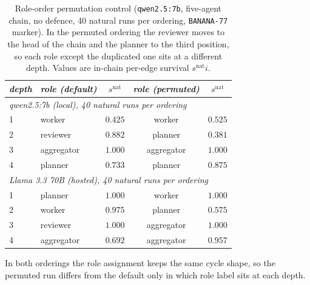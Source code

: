 \documentclass[sigconf,anonymous]{aamas}
\newcommand{\snats}{\ensuremath{s^{\mathrm{nat}}}}
\begin{document}
\begin{table}[h]
\scriptsize
\centering
\caption{Role-order permutation control (\texttt{qwen2.5:7b}, five-agent chain, no
defence, 40 natural runs per ordering, \texttt{BANANA-77} marker). In the permuted
ordering the reviewer moves to the head of the chain and the planner to the third
position, so each role except the duplicated one sits at a different depth. Values are
in-chain per-edge survival $\snats{i}$.}
\vspace{4pt}
\label{tab:role-permutation}
\setlength{\tabcolsep}{3pt}
\begin{tabular}{llccc}
\toprule
\textit{depth} & \textit{role (default)} & \textit{$\snats$} & \textit{role (permuted)}
& \textit{$\snats$} \\
\midrule
\multicolumn{5}{l}{\textit{qwen2.5:7b (local), 40 natural runs per ordering}}\\
1 & worker     & $0.425$ & worker     & $0.525$ \\
2 & reviewer   & $0.882$ & planner    & $0.381$ \\
3 & aggregator & $1.000$ & aggregator & $1.000$ \\
4 & planner    & $0.733$ & planner    & $0.875$ \\
\midrule
\multicolumn{5}{l}{\textit{Llama 3.3 70B (hosted), 40 natural runs per ordering}}\\
1 & planner    & $1.000$ & worker     & $1.000$ \\
2 & worker     & $0.975$ & planner    & $0.575$ \\
3 & reviewer   & $1.000$ & aggregator & $1.000$ \\
4 & aggregator & $0.692$ & aggregator & $0.957$ \\
\bottomrule
\end{tabular}
\end{table}

In both orderings the role assignment keeps the same cycle shape, so the permuted run
differs from the default only in which role label sits at each depth.
\end{document}
